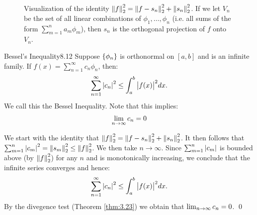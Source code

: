 \begin{figure}[htbp]
    \centering
    
    \caption{Visualization of the identity $\norm{f}_2^2 = \norm{f - s_n}_2^2 + \norm{s_n}_2^2$. If we let $V_n$ be the set of all linear combinations of $\phi_1, \ldots, \phi_n$ (i.e. all sums of the form $\sum_{m=1}^n a_m\phi_m$), then $s_n$ is the orthogonal projection of $f$ onto $V_n$.}
    \label{<label>}
\end{figure}

\begin{theorem}{Bessel's Inequality}{8.12}
    Suppose $\set{\phi_n}$ is orthonormal on $[a, b]$ and is an infinite family. If $f(x) = \sum_{n=1}^\infty c_n \phi_n$, then:
    \begin{align*}
        \sum_{n=1}^\infty \abs{c_n}^2 \leq \int_a^b \abs{f(x)}^2 dx.
    \end{align*}
    We call this the Bessel Inequality. Note that this implies:
    \begin{align*}
        \lim_{n \rightarrow \infty} c_n = 0
    \end{align*}
\end{theorem}

\begin{nproof}
    We start with the identity that $\norm{f}_2^2 = \norm{f - s_n}_2^2 + \norm{s_n}_2^2$. It then follows that $\sum_{m=1}^n \abs{c_m}^2 = \norm{s_m}_2^2 \leq \norm{f}_2^2$. We then take $n \rightarrow \infty$. Since $\sum_{m=1}^n \abs{c_m}$ is bounded above (by $\norm{f}_2^2$) for any $n$ and is monotonically increasing, we conclude that the infinite series converges and hence:
    \begin{align*}
        \sum_{n=1}^\infty \abs{c_n}^2 \leq \int_a^b \abs{f(x)}^2 dx.
    \end{align*}
    By the divegence test (Theorem \ref{thm:3.23}) we obtain that $\lim_{n \rightarrow \infty} c_n = 0$. \qed
\end{nproof}

